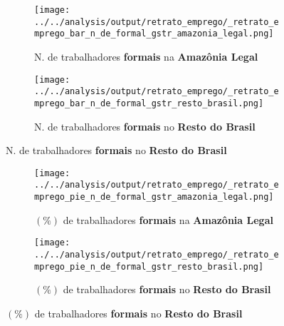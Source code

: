 \documentclass[11pt]{beamer}
\begin{document}
\begin{frame}[label=_retrato_emprego_bar_n_de_formal_gstr]{}
\textit{\hyperlink{indice_principal}{}}
\begin{figure}
\centering
\begin{subfigure}{.5\textwidth}
  \centering
  \texttt{[image: ../../analysis/output/retrato\_emprego/\_retrato\_emprego\_bar\_n\_de\_formal\_gstr\_amazonia\_legal.png]}
  \label{fig:_retrato_emprego_bar_n_de_formal_gstr_amazonia_legal}
  \caption{{\tiny N. de trabalhadores \textbf{formais} na \textbf{Amazônia Legal}}}
\end{subfigure}%
\begin{subfigure}{.5\textwidth}
  \centering
  \texttt{[image: ../../analysis/output/retrato\_emprego/\_retrato\_emprego\_bar\_n\_de\_formal\_gstr\_resto\_brasil.png]}
  \label{fig:_retrato_emprego_bar_n_de_formal_gstr_resto_brasil}
   \caption{{\tiny N. de trabalhadores \textbf{formais} no \textbf{Resto do Brasil}}}
\end{subfigure}
\end{figure}
\end{frame}

\begin{frame}[label=_retrato_emprego_pie_n_de_formal_gstr]{}
\textit{\hyperlink{indice_principal}{}}
\begin{figure}
\centering
\begin{subfigure}{.5\textwidth}
  \centering
  \texttt{[image: ../../analysis/output/retrato\_emprego/\_retrato\_emprego\_pie\_n\_de\_formal\_gstr\_amazonia\_legal.png]}
  \label{fig:_retrato_emprego_pie_n_de_formal_gstr_amazonia_legal}
  \caption{{\tiny $(\%)$ de trabalhadores \textbf{formais} na \textbf{Amazônia Legal}}}
\end{subfigure}%
\begin{subfigure}{.5\textwidth}
  \centering
  \texttt{[image: ../../analysis/output/retrato\_emprego/\_retrato\_emprego\_pie\_n\_de\_formal\_gstr\_resto\_brasil.png]}
  \label{fig:_retrato_emprego_pie_n_de_formal_gstr_resto_brasil}
   \caption{{\tiny $(\%)$ de trabalhadores \textbf{formais} no \textbf{Resto do Brasil}}}
\end{subfigure}
\end{figure}
\end{frame}
\end{document}
